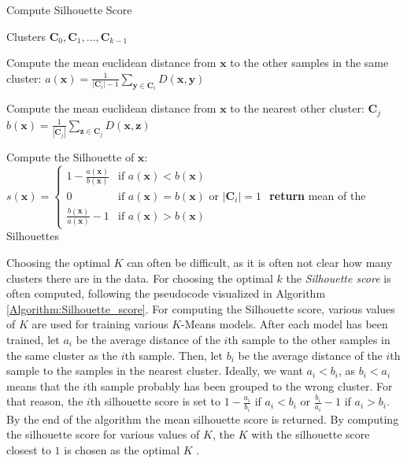 \documentclass[./main.tex]{subfiles}
\begin{document}
\begin{algorithm}[htbp]
    \caption{Compute Silhouette Score \cite{MAD_L12}}
    \label{Algorithm:Silhouette_score}
    \begin{algorithmic}[1]
        \Require Clusters $\bm{C}_0, \bm{C}_1, ..., \bm{C}_{k - 1}$
                \State \begin{varwidth}[t]{\linewidth}
                    Compute the mean euclidean distance from $\bm{x}$ to the other samples in the same cluster: $a(\bm{x}) = \frac{1}{|\bm{C}_i| - 1} \sum_{\bm{y} \in \bm{C}_i} D(\bm{x}, \bm{y})$
                \end{varwidth}
                \State \begin{varwidth}[t]{\linewidth}
                Compute the mean euclidean distance from $\bm{x}$ to the nearest other cluster: $\bm{C}_j$ $b(\bm{x}) = \frac{1}{| \bm{C}_j |} \sum_{\bm{z} \in \bm{C}_j} D(\bm{x}, \bm{z})$
                \end{varwidth}
                \State Compute the Silhouette of $\bm{x}$:
                \begin{math}
                    s(\bm{x}) =
                    \begin{cases}
                        1 - \frac{a(\bm{x})}{b(\bm{x})} & \text{if } a(\bm{x}) < b(\bm{x}) \\
                        0 & \text{if } a(\bm{x}) = b(\bm{x}) \text{ or } |\bm{C}_i| = 1 \\
                        \frac{b(\bm{x})}{a(\bm{x})} - 1 & \text{if } a(\bm{x}) > b(\bm{x})
                    \end{cases}
                \end{math}
            \EndFor
        \EndFor
        \State \textbf{return} mean of the Silhouettes
    \end{algorithmic}
\end{algorithm}
\noindent Choosing the optimal $K$ can often be difficult, as it is often not clear how many clusters there are in the data. For choosing the optimal $k$ the \textit{Silhouette score} is often computed, following the pseudocode visualized in Algorithm \ref{Algorithm:Silhouette_score}. For computing the Silhouette score, various values of $K$ are used for training various $K$-Means models. After each model has been trained, let $a_i$ be the average distance of the $i$th sample to the other samples in the same cluster as the $i$th sample. Then, let $b_i$ be the average distance of the $i$th sample to the samples in the nearest cluster. Ideally, we want $a_i < b_i$, as $b_i < a_i$ means that the $i$th sample probably has been grouped to the wrong cluster. For that reason, the $i$th silhouette score is set to $1 - \frac{a_i}{b_i}$ if $a_i < b_i$ or $\frac{b_i}{a_i} - 1$ if $a_i > b_i$. By the end of the algorithm the mean silhouette score is returned. By computing the silhouette score for various values of $K$, the $K$ with the silhouette score closest to $1$ is chosen as the optimal $K$ \cite{MAD_L12}.
\end{document}
